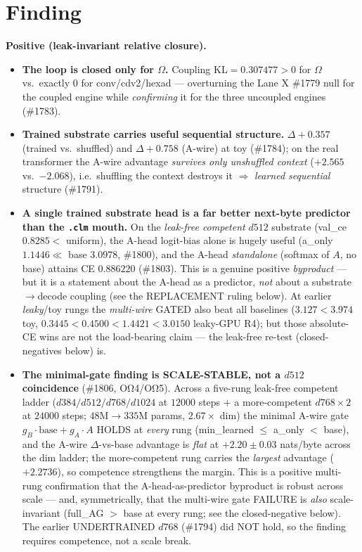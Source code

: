 \documentclass[11pt]{article}
\begin{document}
\section{Finding}
\label{sec:finding}
\textbf{Positive (leak-invariant relative closure).}
\begin{itemize}
\item \textbf{The loop is closed only for $\Omega$.} Coupling $\mathrm{KL}=0.307477>0$ for
$\Omega$ vs.\ exactly $0$ for conv/cdv2/hexad --- overturning the Lane X \#1779 null for the
coupled engine while \emph{confirming} it for the three uncoupled engines (\#1783).
\item \textbf{Trained substrate carries useful sequential structure.} $\Delta{+}0.357$
(trained vs.\ shuffled) and $\Delta{+}0.758$ (A-wire) at toy (\#1784); on the real transformer
the A-wire advantage \emph{survives only unshuffled context} ($+2.565$ vs.\ $-2.068$), i.e.\
shuffling the context destroys it $\Rightarrow$ \emph{learned sequential} structure (\#1791).
\item \textbf{A single trained substrate head is a far better next-byte predictor than the
\texttt{.clm} mouth.} On the \emph{leak-free competent} $d512$ substrate (val\_ce $0.8285<$
uniform), the A-head logit-bias alone is hugely useful (a\_only $1.1446\ll$ base $3.0978$,
\#1800), and the A-head \emph{standalone} (softmax of $A$, no base) attains CE $0.886220$
(\#1803). This is a genuine positive \emph{byproduct} --- but it is a statement about the
A-head as a predictor, \emph{not} about a substrate$\rightarrow$decode coupling (see the
REPLACEMENT ruling below). At earlier \emph{leaky}/toy rungs the \emph{multi-wire} GATED also
beat all baselines ($3.127<3.974$ toy, $0.3445<0.4500<1.4421<3.0150$ leaky-GPU R4); but those
absolute-CE wins are not the load-bearing claim --- the leak-free re-test (closed-negatives
below) is.
\item \textbf{The minimal-gate finding is SCALE-STABLE, not a $d512$ coincidence} (\#1806,
OΩ4/OΩ5). Across a five-rung leak-free competent ladder ($d384/d512/d768/d1024$ at $12000$ steps
$+$ a more-competent $d768{\times}2$ at $24000$ steps; $48$M$\rightarrow$$335$M params, $2.67\times$
dim) the minimal A-wire gate $g_B\!\cdot\!\text{base}+g_A\!\cdot\!A$ HOLDS at \emph{every} rung
(min\_learned $\le$ a\_only $<$ base), and the A-wire $\Delta$-vs-base advantage is \emph{flat} at
$+2.20\pm0.03$ nats/byte across the dim ladder; the more-competent rung carries the \emph{largest}
advantage ($+2.2736$), so competence strengthens the margin. This is a positive multi-rung
confirmation that the A-head-as-predictor byproduct is robust across scale --- and, symmetrically,
that the multi-wire gate FAILURE is \emph{also} scale-invariant (full\_AG $>$ base at every rung; see
the closed-negative below). The earlier UNDERTRAINED $d768$ (\#1794) did NOT hold, so the finding
requires competence, not a scale break.
\end{itemize}
\end{document}
